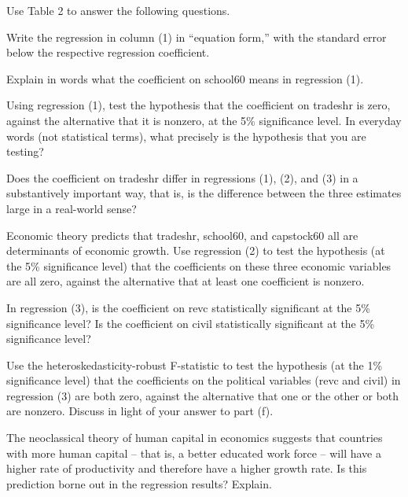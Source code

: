 \documentclass[12pt]{article}
\begin{document}
Use Table 2 to answer the following questions.
\begin{list}{) ~}{}
\item Write the regression in column (1) in “equation form,” with the standard error below the respective regression coefficient.
\item Explain in words what the coefficient on school60 means in regression (1).
\item Using regression (1), test the hypothesis that the coefficient on tradeshr is zero, against the alternative that it is nonzero, at the 5\% significance level. In everyday words (not statistical terms), what precisely is the hypothesis that you are testing?
\item Does the coefficient on tradeshr differ in regressions (1), (2), and (3) in a substantively important way, that is, is the difference between the three estimates large in a real-world sense?
\item Economic theory predicts that tradeshr, school60, and capstock60 all are determinants of economic growth. Use regression (2) to test the hypothesis (at the 5\% significance level) that the coefficients on these three economic variables are all zero, against the alternative that at least one coefficient is nonzero.
\item In regression (3), is the coefficient on revc statistically significant at the 5\% significance level? Is the coefficient on civil statistically significant at the 5\% significance level? 
\item Use the heteroskedasticity-robust F-statistic to test the hypothesis (at the 1\% significance level) that the coefficients on the political variables (revc and civil) in regression (3) are both zero, against the alternative that one or the other or both are nonzero. Discuss in light of your answer to part (f).
\item The neoclassical theory of human capital in economics suggests that countries with more human capital – that is, a better educated work force – will have a higher rate of productivity and therefore have a higher growth rate. Is this prediction borne out in the regression results? Explain.
\end{list}
\end{document}
